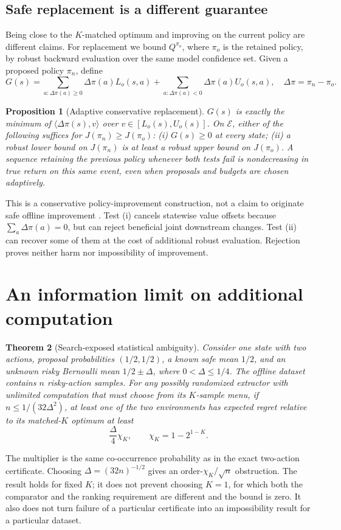 \documentclass[11pt]{article}
\newtheorem{theorem}{Theorem}
\newtheorem{proposition}[theorem]{Proposition}
\begin{document}
\subsection{Safe replacement is a different guarantee}
Being close to the $K$-matched optimum and improving on the current policy are different claims. For replacement we bound $Q^{\pi_o}$, where $\pi_o$ is the retained policy, by robust backward evaluation over the same model confidence set. Given a proposed policy $\pi_n$, define
\begin{equation}
 G(s)=\sum_{a:\Delta\pi(a)\ge0}\Delta\pi(a)L_o(s,a)
      +\sum_{a:\Delta\pi(a)<0}\Delta\pi(a)U_o(s,a),
 \quad \Delta\pi=\pi_n-\pi_o.
 \label{eq:gate}
\end{equation}
\begin{proposition}[Adaptive conservative replacement]\label{prop:gate}
$G(s)$ is exactly the minimum of $\langle\Delta\pi(s),v\rangle$ over $v\in[L_o(s),U_o(s)]$. On $\mathcal E$, either of the following suffices for $J(\pi_n)\ge J(\pi_o)$: (i) $G(s)\ge0$ at every state; (ii) a robust lower bound on $J(\pi_n)$ is at least a robust upper bound on $J(\pi_o)$. A sequence retaining the previous policy whenever both tests fail is nondecreasing in true return on this same event, even when proposals and budgets are chosen adaptively.
\end{proposition}
This is a conservative policy-improvement construction, not a claim to originate safe offline improvement \citep{laroche2019spibb}. Test (i) cancels statewise value offsets because $\sum_a\Delta\pi(a)=0$, but can reject beneficial joint downstream changes. Test (ii) can recover some of them at the cost of additional robust evaluation. Rejection proves neither harm nor impossibility of improvement.

\section{An information limit on additional computation}
\begin{theorem}[Search-exposed statistical ambiguity]\label{thm:stat}
Consider one state with two actions, proposal probabilities $(1/2,1/2)$, a known safe mean $1/2$, and an unknown risky Bernoulli mean $1/2\pm\Delta$, where $0<\Delta\le1/4$. The offline dataset contains $n$ risky-action samples. For any possibly randomized extractor with unlimited computation that must choose from its $K$-sample menu, if $n\le1/(32\Delta^2)$, at least one of the two environments has expected regret relative to its matched-$K$ optimum at least
\begin{equation}
 \frac{\Delta}{4}\chi_K,\qquad \chi_K=1-2^{1-K}.
 \label{eq:stat-lower}
\end{equation}
\end{theorem}
The multiplier is the same co-occurrence probability as in the exact two-action certificate. Choosing $\Delta=(32n)^{-1/2}$ gives an order-$\chi_K/\sqrt n$ obstruction. The result holds for fixed $K$; it does not prevent choosing $K=1$, for which both the comparator and the ranking requirement are different and the bound is zero. It also does not turn failure of a particular certificate into an impossibility result for a particular dataset.
\end{document}
